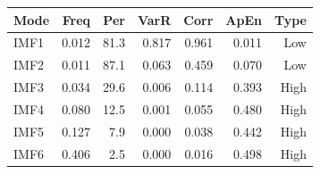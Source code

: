 {\tiny\setlength{\tabcolsep}{1pt}\begin{tabular}{lrrrrrr} \toprule
Mode & Freq & Per & VarR & Corr & ApEn & Type \\ \midrule
IMF1 & 0.012 & 81.3 & 0.817 & 0.961 & 0.011 & Low \\ 
IMF2 & 0.011 & 87.1 & 0.063 & 0.459 & 0.070 & Low \\ 
IMF3 & 0.034 & 29.6 & 0.006 & 0.114 & 0.393 & High \\ 
IMF4 & 0.080 & 12.5 & 0.001 & 0.055 & 0.480 & High \\ 
IMF5 & 0.127 & 7.9 & 0.000 & 0.038 & 0.442 & High \\ 
IMF6 & 0.406 & 2.5 & 0.000 & 0.016 & 0.498 & High \\ 
\bottomrule \end{tabular}}